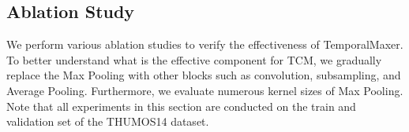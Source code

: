 \documentclass[10pt,twocolumn,letterpaper]{article}
\begin{document}
\begin{table}[]
\centering
{}\caption{Comparison with the state-of-the-art methods on the MultiTHUMOS dataset. We report the results at different tIoU thresholds [0.2, 0.5, 0.7] and average mAP in [0.1:0.9:0.1].}
\label{table:sota_multihumos}
\end{table}
 
\subsection{Ablation Study}
\label{section:ablation}
We perform various ablation studies to verify the effectiveness of TemporalMaxer. To better understand what is the effective component for TCM, we gradually replace the  Max Pooling with other blocks such as convolution, subsampling, and Average Pooling. Furthermore, we evaluate numerous kernel sizes of Max Pooling. Note that all experiments in this section are conducted on the train and validation set of the THUMOS14 dataset.
\end{document}
